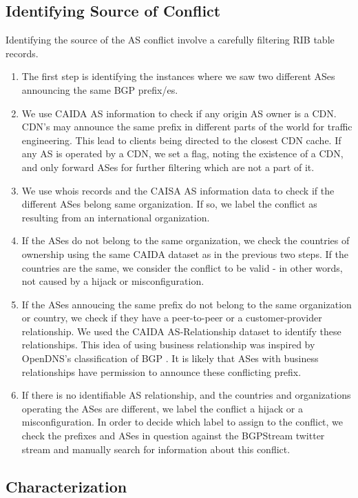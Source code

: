 \subsection{Identifying Source of Conflict}
Identifying the source of the AS conflict involve a carefully filtering RIB table records. 
\begin{enumerate}
\item The first step is identifying the instances where we saw two different ASes announcing the same BGP prefix/es.
\item We use CAIDA AS information to check if any origin AS owner is a CDN. CDN's may announce the same prefix in different parts of the world for traffic engineering. This lead to clients being directed to the closest CDN cache. If any AS is operated by a CDN, we set a flag, noting the existence of a CDN, and only forward ASes for further filtering which are not a part of it. 
\item We use whois records and the CAISA AS information data  to check if the different ASes belong same organization. If so, we label the conflict as resulting from an international organization.
\item If the ASes do not belong to the same organization, we check the countries of ownership using the same CAIDA dataset as in the previous two steps. If the countries are the same, we consider the conflict to be valid - in other words, not caused by a hijack or misconfiguration.
\item If the ASes annoucing the same prefix do not belong to the same organization or country, we check if they have a peer-to-peer or a customer-provider relationship. We used the CAIDA AS-Relationship dataset to identify these relationships. This idea of using business relationship was inspired by OpenDNS's classification of BGP \cite{opendns_blackhat_2015}. It is likely that ASes with business relationships have permission to announce these conflicting prefix. 
\item If there is no identifiable AS relationship, and the countries and organizations operating the ASes are different, we label the conflict a hijack or a misconfiguration. In order to decide which label to assign to the conflict, we check the prefixes and ASes in question against the BGPStream twitter stream and manually search for information about this conflict.
\end{enumerate}

\subsection{Characterization }

